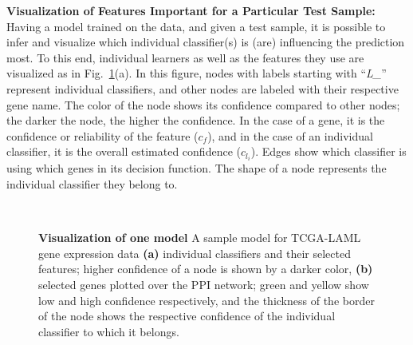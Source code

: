 \textbf{Visualization of  Features Important for a Particular Test Sample:}
Having a model trained on the data, and given a test sample, it is possible to infer and visualize which individual classifier(s) is (are) influencing the prediction most. To this end, individual learners as well as the features they use are visualized as in Fig.~\ref{fig:sample-model}(a). 
In this figure, nodes with labels starting with ``\emph{L\_}'' represent individual classifiers, and other nodes are labeled with their respective gene name. The color of the node shows its confidence compared to other nodes; the darker the node, the higher the confidence. In the case of a gene, it is the confidence or reliability of the feature ($c_f$), and in the case of an individual classifier, it is the overall estimated confidence ($c_{l_i}$). Edges show which classifier is using which genes in its decision function. The shape of a node represents the individual classifier they belong to.

\begin{figure}[!tpb]
\setlength{\fboxsep}{0pt}%
\setlength{\fboxrule}{0.5pt}%
  \ \ 
  \caption{\textbf{Visualization of one model} A sample model for TCGA-LAML gene expression data \textbf{(a)} individual classifiers and their selected features; higher confidence of a node is shown by a darker color, \textbf{(b)} selected genes plotted over the PPI network; green and yellow show low and high confidence respectively, and the thickness of the border of the node shows the respective confidence of the individual classifier to which it belongs.}
  \label{fig:sample-model}
\end{figure}

